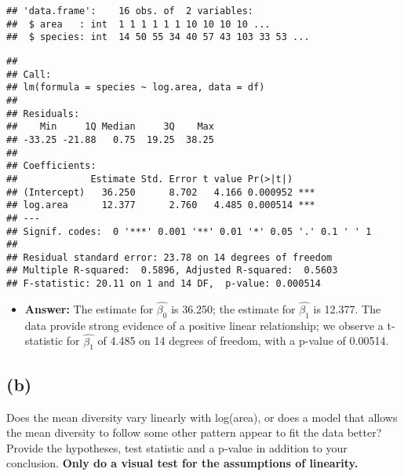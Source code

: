 \documentclass[]{article}
\newenvironment{Shaded}{\begin{snugshade}}{\end{snugshade}}
\newcommand{\KeywordTok}[1]{\textcolor[rgb]{0.13,0.29,0.53}{\textbf{#1}}}
\newcommand{\DataTypeTok}[1]{\textcolor[rgb]{0.13,0.29,0.53}{#1}}
\newcommand{\OperatorTok}[1]{\textcolor[rgb]{0.81,0.36,0.00}{\textbf{#1}}}
\newcommand{\NormalTok}[1]{#1}
\providecommand{\tightlist}{%
  \setlength{\itemsep}{0pt}\setlength{\parskip}{0pt}}
\begin{document}
\begin{verbatim}
## 'data.frame':    16 obs. of  2 variables:
##  $ area   : int  1 1 1 1 1 1 10 10 10 10 ...
##  $ species: int  14 50 55 34 40 57 43 103 33 53 ...
\end{verbatim}

\begin{Shaded}
\end{Shaded}

\begin{verbatim}
## 
## Call:
## lm(formula = species ~ log.area, data = df)
## 
## Residuals:
##    Min     1Q Median     3Q    Max 
## -33.25 -21.88   0.75  19.25  38.25 
## 
## Coefficients:
##             Estimate Std. Error t value Pr(>|t|)    
## (Intercept)   36.250      8.702   4.166 0.000952 ***
## log.area      12.377      2.760   4.485 0.000514 ***
## ---
## Signif. codes:  0 '***' 0.001 '**' 0.01 '*' 0.05 '.' 0.1 ' ' 1
## 
## Residual standard error: 23.78 on 14 degrees of freedom
## Multiple R-squared:  0.5896, Adjusted R-squared:  0.5603 
## F-statistic: 20.11 on 1 and 14 DF,  p-value: 0.000514
\end{verbatim}

\begin{itemize}
\tightlist
\item
  \textbf{Answer:} The estimate for \(\hat{\beta_0}\) is 36.250; the
  estimate for \(\hat{\beta_1}\) is 12.377. The data provide strong
  evidence of a positive linear relationship; we observe a t-statistic
  for \(\hat{\beta_1}\) of 4.485 on 14 degrees of freedom, with a
  p-value of 0.00514.
\end{itemize}

\subsection{(b)}\label{b-3}

Does the mean diversity vary linearly with log(area), or does a model
that allows the mean diversity to follow some other pattern appear to
fit the data better? Provide the hypotheses, test statistic and a
p-value in addition to your conclusion. \textbf{Only do a visual test
for the assumptions of linearity.}
\end{document}
